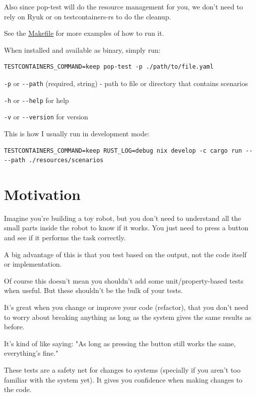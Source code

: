 \documentclass[11pt]{article}
\begin{document}
Also since pop-test will do the resource management for you, we don't need to rely on Ryuk or on testcontainers-rs to do the cleanup.

See the \href{file:///home/joe/Ontwikkeling/Persoonlijk/pop-test/Makefile}{Makefile} for more examples of how to run it.

When installed and available as binary, simply run:
\begin{verbatim}
TESTCONTAINERS_COMMAND=keep pop-test -p ./path/to/file.yaml
\end{verbatim}

\texttt{-p} or \texttt{-{}-{}path} (required, string) - path to file or directory that contains scenarios

\texttt{-h} or \texttt{-{}-{}help} for help

\texttt{-v} or \texttt{-{}-{}version} for version


This is how I usually run in development mode:
\begin{verbatim}
TESTCONTAINERS_COMMAND=keep RUST_LOG=debug nix develop -c cargo run -- --path ./resources/scenarios
\end{verbatim}



\section{Motivation}
\label{sec:orgdf93601}

Imagine you're building a toy robot, but you don't need to understand all the small parts inside the robot to know if it works. You just need to press a button and see if it performs the task correctly.

A big advantage of this is that you test based on the output, not the code itself or implementation.

Of course this doesn't mean you shouldn't add some unit/property-based tests when useful. But these shouldn't be the bulk of your tests.

It's great when you change or improve your code (refactor), that you don’t need to worry about breaking anything as long as the system gives the same results as before.

It's kind of like saying: "As long as pressing the button still works the same, everything’s fine."

These tests are a safety net for changes to systems (specially if you aren't too familiar with the system yet). It gives you confidence when making changes to the code.
\end{document}
